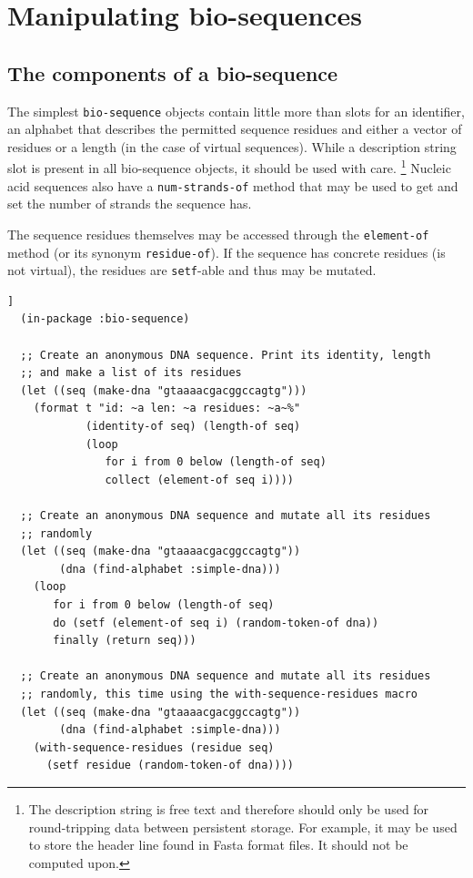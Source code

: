 \documentclass[a4paper, 12pt]{article}
\begin{document}
\section{Manipulating bio-sequences}
\label{sec:manipulating-bioseq}

\subsection{The components of a bio-sequence}
\label{sec:components-of-bioseq}

The simplest \lstinline!bio-sequence! objects contain little more than
slots for an identifier, an alphabet that describes the permitted
sequence residues and either a vector of residues or a length (in the
case of virtual sequences). While a description string slot is present
in all bio-sequence objects, it should be used with
care. \footnote{The description string is free text and therefore
  should only be used for round-tripping data between persistent
  storage. For example, it may be used to store the header line found
  in Fasta format files. It should not be computed upon.}  Nucleic
acid sequences also have a \lstinline!num-strands-of! method that may
be used to get and set the number of strands the sequence has.

The sequence residues themselves may be accessed through the
\lstinline!element-of! method (or its synonym
\lstinline!residue-of!). If the sequence has concrete residues (is not
virtual), the residues are \lstinline!setf!-able and thus may be
mutated. 

\begin{lstlisting}[caption={The components of a bio-sequence},
  label=lst:components-of-bioseq,float=[tbph]]
  (in-package :bio-sequence)

  ;; Create an anonymous DNA sequence. Print its identity, length
  ;; and make a list of its residues
  (let ((seq (make-dna "gtaaaacgacggccagtg")))
    (format t "id: ~a len: ~a residues: ~a~%"
            (identity-of seq) (length-of seq)
            (loop
               for i from 0 below (length-of seq)
               collect (element-of seq i))))

  ;; Create an anonymous DNA sequence and mutate all its residues
  ;; randomly
  (let ((seq (make-dna "gtaaaacgacggccagtg"))
        (dna (find-alphabet :simple-dna)))
    (loop
       for i from 0 below (length-of seq)
       do (setf (element-of seq i) (random-token-of dna))
       finally (return seq)))
  
  ;; Create an anonymous DNA sequence and mutate all its residues
  ;; randomly, this time using the with-sequence-residues macro
  (let ((seq (make-dna "gtaaaacgacggccagtg"))
        (dna (find-alphabet :simple-dna)))
    (with-sequence-residues (residue seq)
      (setf residue (random-token-of dna))))
\end{lstlisting}
\end{document}
